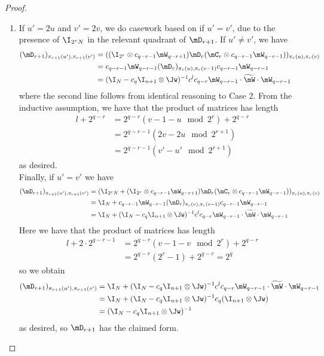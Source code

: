 \documentclass[11pt]{article}
\begin{document}
\begin{proof}
\begin{enumerate}
    \item If $u'=2u$ and $v'=2v$, we do casework based on if $u'=v'$, due to the presence of $\I_{2^rN}$ in the relevant quadrant of $\mD_{r+1}$. If $u'\neq v'$, we have
    \begin{align*}
        (\mD_{r+1})_{\pi_{r+1}(u'),\pi_{r+1}(v')}
        &= ((\I_{2^r}\otimes c_{q-r-1}\mW_{q-r+1})\mD_{r}(\mC_{r} \otimes c_{q-r-1}\mW_{q-r-1}))_{\pi_r(u),\pi_r(v)}\\
        &=   c_{q-r-1}\mW_{q-r-1}(\mD_r)_{\pi_r(u),\pi_r(v-1)}c_{q-r-1}\mW_{q-r-1}\\
        &= (\I_N-c_q\I_{n+1}\otimes\Jw)^{-1}c^{l}c_{q-r}\mW_{q-r-1}\cdot \widetilde{\mW}\cdot \mW_{q-r-1}%
    \end{align*}
    where %
    the second line follows from identical reasoning to Case 2. From the inductive assumption, we have that the product of matrices has length 
    \begin{align*}
        l+2^{q-r}&=2^{q-r}(v-1-u \mod 2^{r})+2^{q-r}\\
        &=2^{q-r-1}(2v-2u \mod 2^{r+1})\\
        &=2^{q-r-1}(v'-u' \mod 2^{r+1})
    \end{align*}
    as desired.\\
    
    Finally, if $u'=v'$ we have 
     \begin{align*}
        (\mD_{r+1})_{\pi_{r+1}(u'),\pi_{r+1}(v')} &= (\I_{2^{r}N}+(\I_{2^r}\otimes c_{q-r-1}\mW_{q-r+1})\mD_{r}(\mC_{r} \otimes c_{q-r-1}\mW_{q-r-1}))_{\pi_r(u),\pi_r(v)}\\
        &= \I_N+c_{q-r-1}\mW_{q-r-1}(\mD_r)_{\pi_r(v),\pi_r(v-1)}c_{q-r-1}\mW_{q-r-1}\\
        &= \I_N+(\I_N-c_q\I_{n+1}\otimes\Jw)^{-1}c^{l}c_{q-r}\mW_{q-r-1}\cdot \widetilde{\mW}\cdot \mW_{q-r-1}
    \end{align*}
    Here we have that the product of matrices has length 
    \begin{align*}
        l+2\cdot 2^{q-r-1} &=2^{q-r}(v-1-v \mod 2^r)+ 2^{q-r}\\
        &=2^{q-r}(2^r-1)+2^{q-r}=2^q
    \end{align*} 
    so we obtain 
    \begin{align*}
        (\mD_{r+1})_{\pi_{r+1}(u'),\pi_{r+1}(v')} &= \I_N+(\I_N-c_q\I_{n+1}\otimes\Jw)^{-1}c^{l}c_{q-r}\mW_{q-r-1}\cdot \widetilde{\mW}\cdot \mW_{q-r-1}\\
        &= \I_N+(\I_N-c_q\I_{n+1}\otimes\Jw)^{-1}c_q(\I_{n+1}\otimes\Jw)\\
        &=(\I_N-c_q\I_{n+1}\otimes\Jw)^{-1}
    \end{align*}
    as desired, so $\mD_{r+1}$ has the claimed form.
\end{enumerate}


\end{proof}
\end{document}
